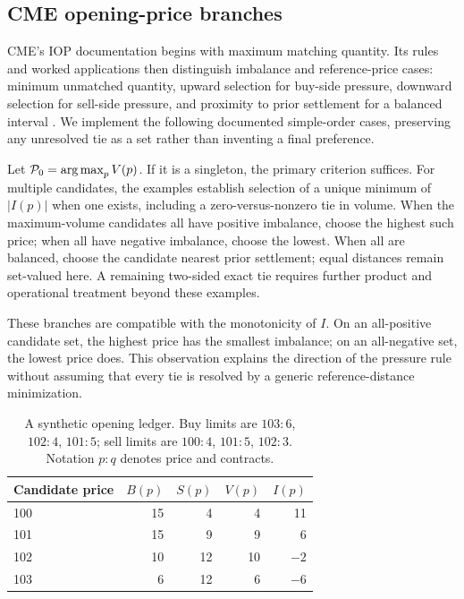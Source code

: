 \subsection{CME opening-price branches}

CME's IOP documentation begins with maximum matching quantity. Its rules and worked applications then distinguish imbalance and reference-price cases: minimum unmatched quantity, upward selection for buy-side pressure, downward selection for sell-side pressure, and proximity to prior settlement for a balanced interval \citep{CMEIOPRules,CMEIOPExamples}. We implement the following documented simple-order cases, preserving any unresolved tie as a set rather than inventing a final preference.

Let $\mathcal P_0=\operatorname*{arg\,max}_pV(p)$. If it is a singleton, the primary criterion suffices. For multiple candidates, the examples establish selection of a unique minimum of $|I(p)|$ when one exists, including a zero-versus-nonzero tie in volume. When the maximum-volume candidates all have positive imbalance, choose the highest such price; when all have negative imbalance, choose the lowest. When all are balanced, choose the candidate nearest prior settlement; equal distances remain set-valued here. A remaining two-sided exact tie requires further product and operational treatment beyond these examples.

These branches are compatible with the monotonicity of $I$. On an all-positive candidate set, the highest price has the smallest imbalance; on an all-negative set, the lowest price does. This observation explains the direction of the pressure rule without assuming that every tie is resolved by a generic reference-distance minimization.

\begin{table}[htbp]
\centering\small
\begin{tabular}{@{}lrrrr@{}}
\toprule
Candidate price & $B(p)$ & $S(p)$ & $V(p)$ & $I(p)$\\
\midrule
100 & 15 & 4 & 4 & 11\\
101 & 15 & 9 & 9 & 6\\
102 & 10 & 12 & 10 & $-2$\\
103 & 6 & 12 & 6 & $-6$\\
\bottomrule
\end{tabular}
\caption{A synthetic opening ledger. Buy limits are $103:6$, $102:4$, $101:5$; sell limits are $100:4$, $101:5$, $102:3$. Notation $p:q$ denotes price and contracts.}
\label{tab:opening}
\end{table}

